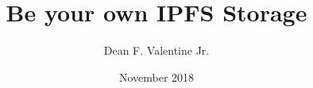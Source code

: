 \documentclass[12pt, letterpaper]{article}
\title{Be your own IPFS Storage}
\author{Dean F. Valentine Jr.}
\date{November 2018}
\begin{document}
\begin{titlepage}
    \maketitle
\end{titlepage}
\end{document}

